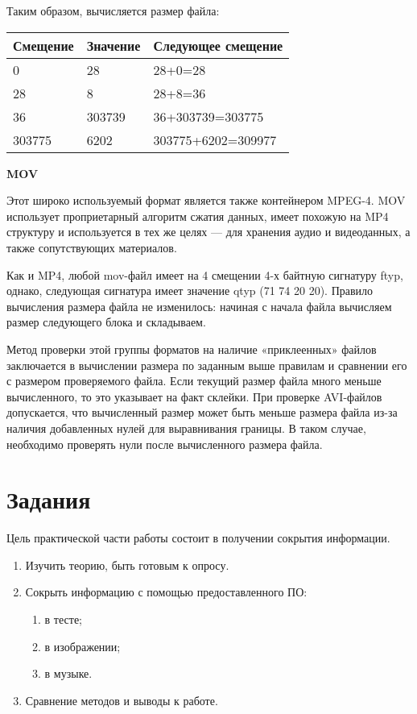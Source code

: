 Таким образом, вычисляется размер файла:
\begin{table} [htbp]%
  \centering
    \captiondelim{ } %
    \label{tabl:tab7x5}%
    \begin{SingleSpace}
      \begin{tabular}{|l|l|l|}
      \hline
      Смещение & Значение & Следующее смещение \\ \hline
      0        & 28       & 28+0=28            \\ \hline
      28       & 8        & 28+8=36            \\ \hline
      36       & 303739   & 36+303739=303775   \\ \hline
      303775   & 6202     & 303775+6202=309977 \\ \hline
      \end{tabular}
    \end{SingleSpace}
\end{table}

\textbf{MOV}

Этот широко используемый формат является также контейнером MPEG-4. MOV
использует проприетарный алгоритм сжатия данных, имеет похожую на MP4
структуру и используется в тех же целях — для хранения аудио и видеоданных, а
также сопутствующих материалов.

Как и MP4, любой mov-файл имеет на 4 смещении 4-х байтную сигнатуру ftyp,
однако, следующая сигнатура имеет значение qtyp (71 74 20 20). Правило
вычисления размера файла не изменилось: начиная с начала файла вычисляем
размер следующего блока и складываем.

Метод проверки этой группы форматов на наличие «приклеенных» файлов
заключается в вычислении размера по заданным выше правилам и сравнении его с
размером проверяемого файла. Если текущий размер файла много меньше
вычисленного, то это указывает на факт склейки. При проверке AVI-файлов
допускается, что вычисленный размер может быть меньше размера файла из-за
наличия добавленных нулей для выравнивания границы. В таком случае,
необходимо проверять нули после вычисленного размера файла.


\section{Задания}\label{sect6_b}
Цель практической части работы состоит в получении 
сокрытия информации.
%
\begin{enumerate}
  \item Изучить теорию, быть готовым к опросу.
  \item Сокрыть информацию с помощью предоставленного ПО: %
  \begin{enumerate}
    \item в тесте;
    \item в изображении;
    \item в музыке.
  \end{enumerate}
  \item Сравнение методов и выводы к работе.
\end{enumerate}
